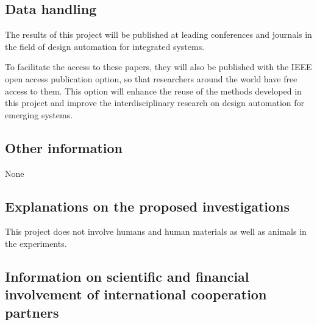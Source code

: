 \vskip 10pt
\subsection{Data handling}

The results of this project will be published at leading conferences and
journals in the field of design automation for integrated systems. 

To facilitate the access to these papers, they will also be published with the IEEE open
access publication option, so that researchers around the world 
have free access to them.
This option will enhance the reuse of the
methods developed in this project and improve the interdisciplinary research
on design automation for emerging systems.


\subsection{Other information}

None


\subsection{Explanations on the proposed investigations}

This project does not involve humans and human materials as well as animals in
the experiments.

\vskip 10pt
\subsection{Information on scientific and financial involvement of
international cooperation partners}



